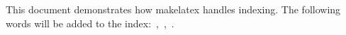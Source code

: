 \documentclass[letterpaper,12pt]{article}
\begin{document}
This document demonstrates how makelatex handles indexing. The following words will be added to the index:~,~,~.

\lipsum[1-3]

\printindex
\end{document}
